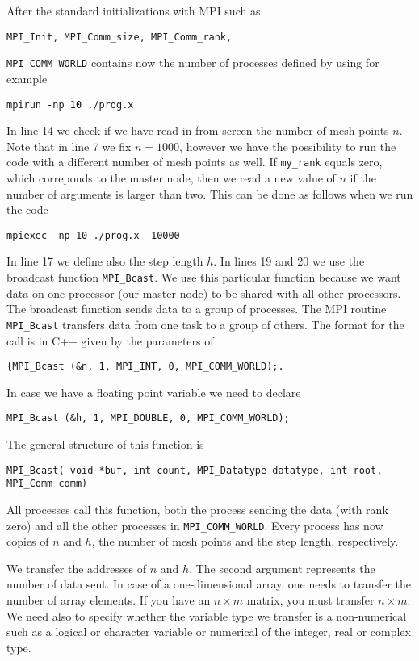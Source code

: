 After the standard initializations with MPI such as
\begin{lstlisting}
MPI_Init, MPI_Comm_size, MPI_Comm_rank,
\end{lstlisting}
\lstinline{MPI_COMM_WORLD} contains now the number of processes
defined  by using for example 
\begin{verbatim}
mpirun -np 10 ./prog.x
\end{verbatim}
In line 14 we check if
we have read in from screen the number of mesh points  $n$. Note that in line 7 we fix $n=1000$, however
we have the possibility to run the code with a different number of mesh points as well.
If \lstinline{my_rank} equals zero, which correponds to the master node, then we read a new value of
$n$  if the number of arguments is larger than two. This can be done as follows when we run the code
\begin{verbatim}
mpiexec -np 10 ./prog.x  10000
\end{verbatim}
In line 17 we define also the step length $h$.
In lines 19 and 20 we use the broadcast function \lstinline{MPI_Bcast}.
We use this particular function because we want data on one processor (our master node) to be shared
with all other processors. The broadcast function sends data to a group of processes. 
The MPI routine \lstinline{MPI_Bcast} transfers data from one task to a group of others. 
The format for the call
is in C++ given by the parameters of 
\begin{lstlisting}
{MPI_Bcast (&n, 1, MPI_INT, 0, MPI_COMM_WORLD);.
\end{lstlisting}
In case we have a floating point variable we need to declare
\begin{lstlisting}
MPI_Bcast (&h, 1, MPI_DOUBLE, 0, MPI_COMM_WORLD);
\end{lstlisting}
The general structure of this function is 
\begin{lstlisting}
MPI_Bcast( void *buf, int count, MPI_Datatype datatype, int root, MPI_Comm comm)
\end{lstlisting}
All processes call this function, both the process sending the data (with rank zero) and all the other
processes in \lstinline{MPI_COMM_WORLD}.  
Every process has now  copies of $n$ and $h$, the number of mesh points and the step length, respectively.

We transfer the addresses of $n$ and $h$.  The second argument represents the number of data sent. In case of 
a one-dimensional array, one needs to transfer the number of array elements. 
If you have an $n\times m$ matrix, you must transfer $n\times m$. We need also to specify whether the variable
type we transfer is a non-numerical such as a logical or character variable or numerical of the integer,
real or complex type. 

